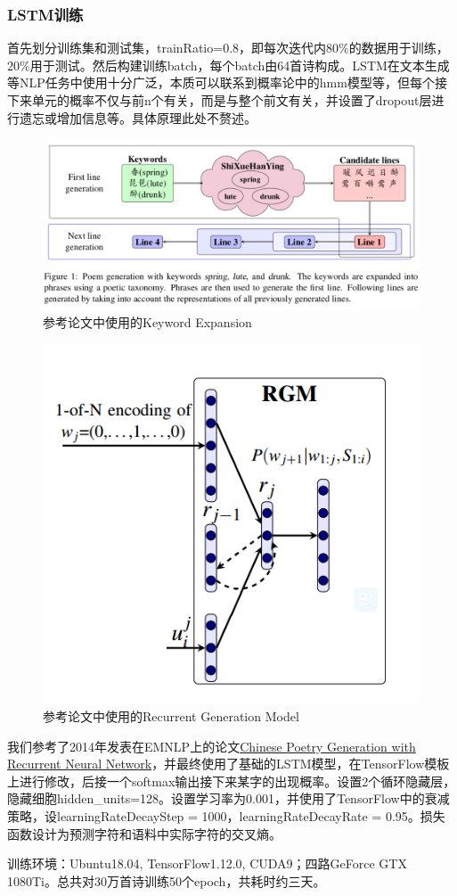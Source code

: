 \documentclass[a4paper, 10pt]{article}
\begin{document}
\subsubsection*{LSTM训练}
首先划分训练集和测试集，trainRatio=0.8，即每次迭代内$80\%$的数据用于训练，$20\%$用于测试。然后构建训练batch，每个batch由64首诗构成。LSTM在文本生成等NLP任务中使用十分广泛，本质可以联系到概率论中的hmm模型等，但每个接下来单元的概率不仅与前n个有关，而是与整个前文有关，并设置了dropout层进行遗忘或增加信息等。具体原理此处不赘述。

\begin{figure}[H]
\centering
\includegraphics[width=0.8\linewidth]{imgs/4.png}
\caption{参考论文中使用的Keyword Expansion}
\end{figure}
\begin{figure}[H]
\centering
\includegraphics[width=0.4\linewidth]{imgs/5.png}
\caption{参考论文中使用的Recurrent Generation Model}
\end{figure}

我们参考了2014年发表在EMNLP上的论文\href{http://aclweb.org/anthology/D/D14/D14-1074.pdf}{Chinese Poetry Generation with Recurrent Neural Network}，并最终使用了基础的LSTM模型，在TensorFlow模板上进行修改，后接一个softmax输出接下来某字的出现概率。设置2个循环隐藏层，隐藏细胞hidden\_units=128。设置学习率为0.001，并使用了TensorFlow中的衰减策略，设learningRateDecayStep = 1000，learningRateDecayRate = 0.95。损失函数设计为预测字符和语料中实际字符的交叉熵。

训练环境：Ubuntu18.04, TensorFlow1.12.0, CUDA9；四路GeForce GTX 1080Ti。总共对30万首诗训练50个epoch，共耗时约三天。
\end{document}
